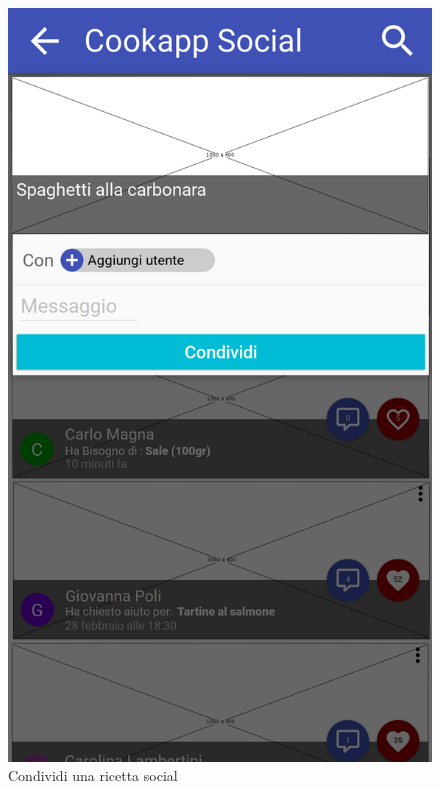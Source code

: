 \begin{figure}[H]
	\begin{minipage}{.49\textwidth}
		\includegraphics[width=\textwidth]{img/wireframe/condividi_ricetta_selezionata.png}
		\caption{Condividi una ricetta social}
		\label{fig:condividi_ricetta}
	\end{minipage}
	\hfill
	\begin{minipage}{.49\textwidth}

\end{minipage}
\end{figure}
